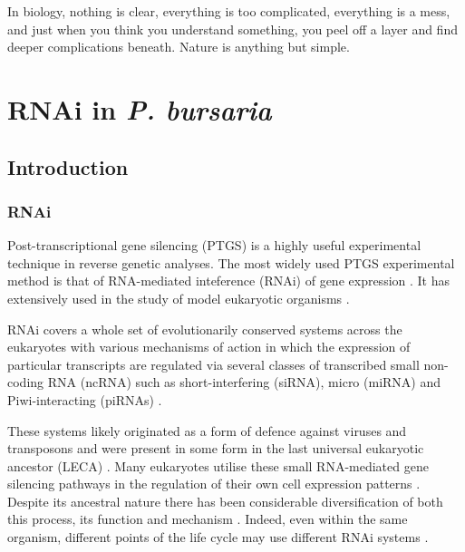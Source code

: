 \graphicspath{{chapters/6.Chapter_4/figures/}}

\begin{savequote}[75mm]
In biology, nothing is clear, everything is too complicated, everything is a mess, 
and just when you think you understand something, you peel off a layer and find 
deeper complications beneath. Nature is anything but simple.
\end{savequote}

\chapter{RNAi in \textit{P. bursaria}}

\section{Introduction}

\subsection{RNAi}

Post-transcriptional gene silencing (PTGS) is a highly useful experimental technique
in reverse genetic analyses.
The most widely used PTGS experimental method is that of RNA-mediated inteference (RNAi)
of gene expression \citep{Fire1998}. It has extensively used in the
study of model eukaryotic organisms \citep{Morf2013,Batista2011,Matthew2004,Ketting2011,Chang2012}.

RNAi covers a whole set of evolutionarily conserved systems across the eukaryotes 
with various mechanisms of action in which the expression of particular transcripts
are regulated via several classes of transcribed small non-coding RNA (ncRNA)
such as short-interfering (siRNA), micro (miRNA) and Piwi-interacting (piRNAs) \citep{Carthew2009}.

These systems likely originated as a form of defence against
viruses and transposons \citep{Waterhouse2001,Buchon2006}
and were present in some form in the last universal eukaryotic
ancestor (LECA) \citep{Cerutti2006,Shabalina2008}.  Many eukaryotes
utilise these small RNA-mediated gene silencing pathways
in the regulation of their own cell expression patterns \citep{Wu2008}.
Despite its ancestral nature there has been considerable diversification
of both this process, its function and mechanism \citep{Ketting2011}.
Indeed, even within the same organism, different points of the life cycle
may use different RNAi systems \citep{Flemr2013}.


